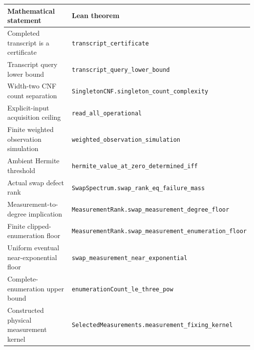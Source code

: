 \documentclass[11pt,letterpaper]{article}
\begin{document}
{\def\LTcaptype{none} %
\begin{longtable}[]{@{}
  >{\raggedright\arraybackslash}p{}
  >{\raggedright\arraybackslash}p{}@{}}
\toprule\noalign{}
\begin{minipage}[b]{\linewidth}\raggedright
Mathematical statement
\end{minipage} & \begin{minipage}[b]{\linewidth}\raggedright
Lean theorem
\end{minipage} \\
\midrule\noalign{}
\endhead
\bottomrule\noalign{}
\endlastfoot
Completed transcript is a certificate &
\texttt{transcript\_certificate} \\
Transcript query lower bound &
\texttt{transcript\_\allowbreak{}query\_\allowbreak{}lower\_\allowbreak{}bound} \\
Width-two CNF count separation &
\texttt{SingletonCNF.\allowbreak{}singleton\_\allowbreak{}count\_\allowbreak{}complexity} \\
Explicit-input acquisition ceiling & \texttt{read\_all\_operational} \\
Finite weighted observation simulation &
\texttt{weighted\_\allowbreak{}observation\_\allowbreak{}simulation} \\
Ambient Hermite threshold &
\texttt{hermite\_\allowbreak{}value\_\allowbreak{}at\_\allowbreak{}zero\_\allowbreak{}determined\_\allowbreak{}iff} \\
Actual swap defect rank &
\texttt{SwapSpectrum.\allowbreak{}swap\_\allowbreak{}rank\_\allowbreak{}eq\_\allowbreak{}failure\_\allowbreak{}mass} \\
Measurement-to-degree implication &
\texttt{MeasurementRank.\allowbreak{}swap\_\allowbreak{}measurement\_\allowbreak{}degree\_\allowbreak{}floor} \\
Finite clipped-enumeration floor &
\texttt{MeasurementRank.\allowbreak{}swap\_\allowbreak{}measurement\_\allowbreak{}enumeration\_\allowbreak{}floor} \\
Uniform eventual near-exponential floor &
\texttt{swap\_\allowbreak{}measurement\_\allowbreak{}near\_\allowbreak{}exponential} \\
Complete-enumeration upper bound &
\texttt{enumerationCount\_\allowbreak{}le\_\allowbreak{}three\_\allowbreak{}pow} \\
Constructed physical measurement kernel &
\texttt{SelectedMeasuremen\allowbreak{}ts.\allowbreak{}measurement\_\allowbreak{}fixing\_\allowbreak{}kernel} \\

\end{longtable}}
\end{document}
